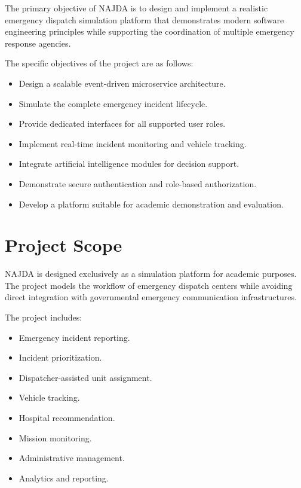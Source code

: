 The primary objective of NAJDA is to design and implement a realistic emergency dispatch simulation platform that demonstrates modern software engineering principles while supporting the coordination of multiple emergency response agencies.

The specific objectives of the project are as follows:

\begin{itemize}
    \item Design a scalable event-driven microservice architecture.
    \item Simulate the complete emergency incident lifecycle.
    \item Provide dedicated interfaces for all supported user roles.
    \item Implement real-time incident monitoring and vehicle tracking.
    \item Integrate artificial intelligence modules for decision support.
    \item Demonstrate secure authentication and role-based authorization.
    \item Develop a platform suitable for academic demonstration and evaluation.
\end{itemize}

\section{Project Scope}

NAJDA is designed exclusively as a simulation platform for academic purposes. The project models the workflow of emergency dispatch centers while avoiding direct integration with governmental emergency communication infrastructures.

The project includes:

\begin{itemize}
    \item Emergency incident reporting.
    \item Incident prioritization.
    \item Dispatcher-assisted unit assignment.
    \item Vehicle tracking.
    \item Hospital recommendation.
    \item Mission monitoring.
    \item Administrative management.
    \item Analytics and reporting.
\end{itemize}

